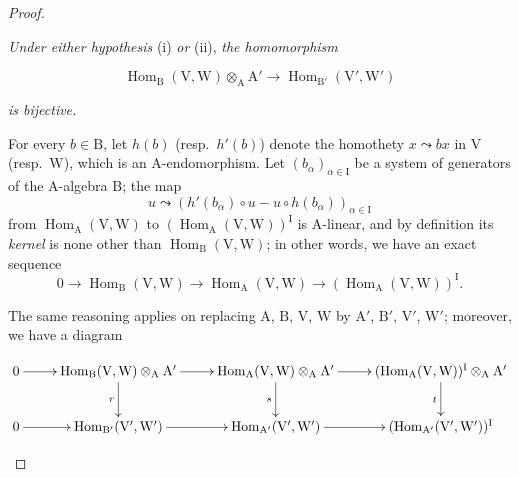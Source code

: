 \begin{proof}
\begin{env}[2.5.8.3]
\label{IV.2.5.8.3}
\emph{Under either hypothesis} (i) \emph{or} (ii), \emph{the
homomorphism}
\end{env}

\begin{env}[2.5.8.4]
\label{IV.2.5.8.4}
\[
  \operatorname{Hom}_{\mathrm{B}}(\mathrm{V},\mathrm{W})\otimes_{\mathrm{A}}\mathrm{A}' \to \operatorname{Hom}_{\mathrm{B}'}(\mathrm{V}',\mathrm{W}')
\]
\end{env}

\emph{is bijective.}

For every $b\in\mathrm{B}$, let $h(b)$ \textnormal{(}resp.\ $h'(b)$\textnormal{)}
denote the homothety $x\leadsto bx$ in $\mathrm{V}$
\textnormal{(}resp.\ $\mathrm{W}$\textnormal{)}, which is an
$\mathrm{A}$-endomorphism. Let
$(b_\alpha)_{\alpha\in\mathrm{I}}$ be a system of generators of the
$\mathrm{A}$-algebra $\mathrm{B}$; the map
\[
  u\leadsto (h'(b_\alpha)\circ u - u\circ h(b_\alpha))_{\alpha\in\mathrm{I}}
\]
from $\operatorname{Hom}_{\mathrm{A}}(\mathrm{V},\mathrm{W})$ to
$(\operatorname{Hom}_{\mathrm{A}}(\mathrm{V},\mathrm{W}))^{\mathrm{I}}$
is $\mathrm{A}$-linear, and by definition its \emph{kernel} is none other than
$\operatorname{Hom}_{\mathrm{B}}(\mathrm{V},\mathrm{W})$; in other words, we
have an exact sequence
\[
  0 \to \operatorname{Hom}_{\mathrm{B}}(\mathrm{V},\mathrm{W}) \to \operatorname{Hom}_{\mathrm{A}}(\mathrm{V},\mathrm{W}) \to (\operatorname{Hom}_{\mathrm{A}}(\mathrm{V},\mathrm{W}))^{\mathrm{I}}.
\]

The same reasoning applies on replacing $\mathrm{A}$, $\mathrm{B}$,
$\mathrm{V}$, $\mathrm{W}$ by $\mathrm{A}'$, $\mathrm{B}'$,
$\mathrm{V}'$, $\mathrm{W}'$; moreover, we have a diagram

\begin{env}[2.5.8.5]
\label{IV.2.5.8.5}
\[
\xymatrix{
  0 \ar[r] & \operatorname{Hom}_{\mathrm{B}}(\mathrm{V},\mathrm{W})\otimes_{\mathrm{A}}\mathrm{A}' \ar[r] \ar[d]_{r} & \operatorname{Hom}_{\mathrm{A}}(\mathrm{V},\mathrm{W})\otimes_{\mathrm{A}}\mathrm{A}' \ar[r] \ar[d]_{s} & (\operatorname{Hom}_{\mathrm{A}}(\mathrm{V},\mathrm{W}))^{\mathrm{I}}\otimes_{\mathrm{A}}\mathrm{A}' \ar[d]_{t} \\
  0 \ar[r] & \operatorname{Hom}_{\mathrm{B}'}(\mathrm{V}',\mathrm{W}') \ar[r] & \operatorname{Hom}_{\mathrm{A}'}(\mathrm{V}',\mathrm{W}') \ar[r] & (\operatorname{Hom}_{\mathrm{A}'}(\mathrm{V}',\mathrm{W}'))^{\mathrm{I}}
}
\]
\end{env}


\end{proof}
